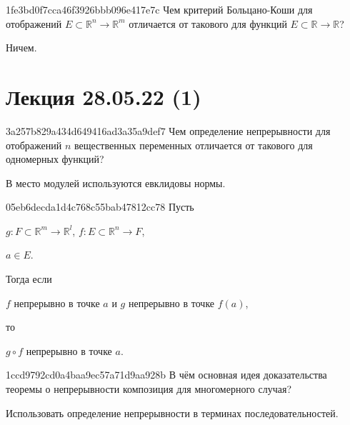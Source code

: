 \begin{note}{1fe3bd0f7cca46f3926bbb096e417e7c}
    Чем критерий Больцано-Коши для отображений \({ E \subset \mathbb R^{n} \to \mathbb R^{m} }\) отличается от такового для функций \({ E \subset \mathbb R \to \mathbb R }\)?

    \begin{cloze}{1}
        Ничем.
    \end{cloze}
\end{note}

\section{Лекция 28.05.22 (1)}
\begin{note}{3a257b829a434d649416ad3a35a9def7}
    Чем определение непрерывности для отображений \({ n }\) вещественных переменных отличается от такового для одномерных функций?

    \begin{cloze}{1}
        В место модулей используются евклидовы нормы.
    \end{cloze}
\end{note}

\begin{note}{05eb6decda1d4c768c55bab47812cc78}
    Пусть \begin{icloze}{4}\({ g : F \subset \mathbb R^{m} \to \mathbb R^{l} }\),\: \({ f : E \subset \mathbb R^{n} \to F }\),\end{icloze}\: \begin{icloze}{3}\({ a \in E }\).\end{icloze}
    Тогда если \begin{icloze}{1}\({ f }\) непрерывно в точке \({ a }\) и \({ g }\) непрерывно в точке \({ f(a) }\),\end{icloze} то
    \begin{icloze}{2}
        \begin{center}
            \({ g \circ f }\) непрерывно в точке \({ a }\).
        \end{center}
    \end{icloze}
\end{note}

\begin{note}{1ccd9792cd0a4baa9ec57a71d9aa928b}
    В чём основная идея доказательства теоремы о непрерывности композиция для многомерного случая?

    \begin{cloze}{1}
        Использовать определение непрерывности в терминах последовательностей.
    \end{cloze}
\end{note}

